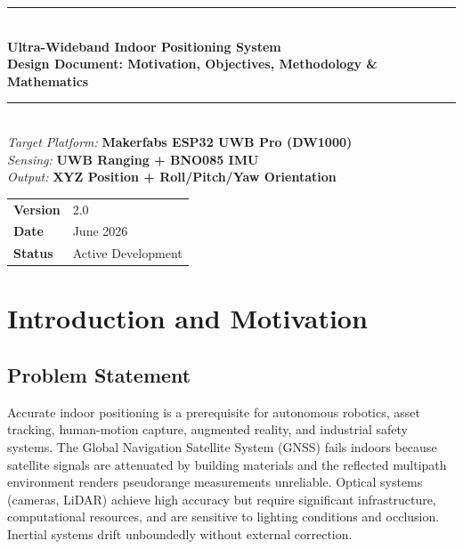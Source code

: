 \documentclass[11pt,a4paper]{article}
\begin{document}
\begin{titlepage}
  \centering
  \vspace*{2cm}
  {\color{uwbblue}\rule{\linewidth}{2pt}}\\[0.5cm]
  {\huge\bfseries Ultra-Wideband Indoor Positioning System\\[0.3cm]
  \large Design Document: Motivation, Objectives, Methodology \& Mathematics}\\[0.4cm]
  {\color{uwbblue}\rule{\linewidth}{2pt}}\\[1.5cm]

  {\large\itshape Target Platform:} \textbf{Makerfabs ESP32 UWB Pro (DW1000)}\\[0.3cm]
  {\large\itshape Sensing:} \textbf{UWB Ranging + BNO085 IMU}\\[0.3cm]
  {\large\itshape Output:} \textbf{XYZ Position + Roll/Pitch/Yaw Orientation}\\[1.5cm]

  \begin{tabular}{ll}
    \textbf{Version}  & 2.0 \\
    \textbf{Date}     & June 2026 \\
    \textbf{Status}   & Active Development \\
  \end{tabular}
  \vfill
\end{titlepage}

\tableofcontents
\newpage

\section{Introduction and Motivation}

\subsection{Problem Statement}

Accurate indoor positioning is a prerequisite for autonomous robotics, asset tracking, human-motion capture, augmented reality, and industrial safety systems. The Global Navigation Satellite System (GNSS) fails indoors because satellite signals are attenuated by building materials and the reflected multipath environment renders pseudorange measurements unreliable. Optical systems (cameras, LiDAR) achieve high accuracy but require significant infrastructure, computational resources, and are sensitive to lighting conditions and occlusion. Inertial systems drift unboundedly without external correction.
\end{document}
